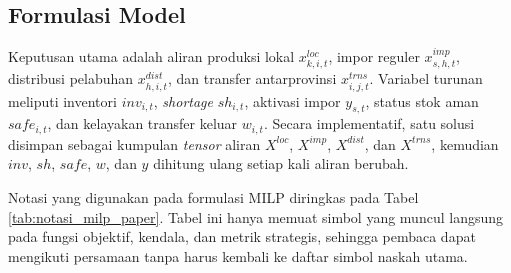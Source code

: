 \documentclass[journal]{IEEEtran}
\theoremstyle{definition}
\theoremstyle{definition}
\theoremstyle{plain}
\begin{document}
    \begin{table}[H]
    \centering
    \caption{Parameter utama hasil pra-pemrosesan data}
    \label{tab:parameter_model}
    \end{table}

    \subsection{Formulasi Model}
    Keputusan utama adalah aliran produksi lokal $x^{loc}_{k,i,t}$, impor reguler $x^{imp}_{s,h,t}$, distribusi pelabuhan $x^{dist}_{h,i,t}$, dan transfer antarprovinsi $x^{trns}_{i,j,t}$. Variabel turunan meliputi inventori $inv_{i,t}$, \textit{shortage} $sh_{i,t}$, aktivasi impor $y_{s,t}$, status stok aman $safe_{i,t}$, dan kelayakan transfer keluar $w_{i,t}$. Secara implementatif, satu solusi disimpan sebagai kumpulan \textit{tensor} aliran $X^{loc}$, $X^{imp}$, $X^{dist}$, dan $X^{trns}$, kemudian $inv$, $sh$, $safe$, $w$, dan $y$ dihitung ulang setiap kali aliran berubah.

    Notasi yang digunakan pada formulasi MILP diringkas pada Tabel \ref{tab:notasi_milp_paper}. Tabel ini hanya memuat simbol yang muncul langsung pada fungsi objektif, kendala, dan metrik strategis, sehingga pembaca dapat mengikuti persamaan tanpa harus kembali ke daftar simbol naskah utama.
\end{document}
